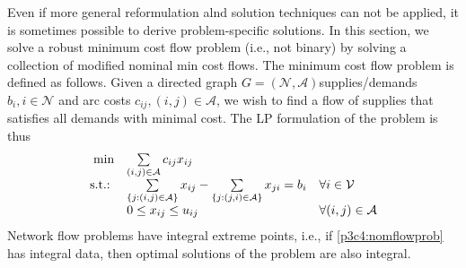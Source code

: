 Even if more general reformulation alnd solution techniques can not be applied, it is sometimes possible to derive problem-specific solutions. In this section, we solve a robust minimum cost flow problem (i.e., not binary) by solving a collection of modified nominal min cost flows. The minimum cost flow problem is defined as follows. Given a directed graph $G=(\mathcal{N}, \mathcal{A})$supplies/demands $b_i,i\in\mathcal{N}$ and arc costs $c_{ij}, (i,j)\in\mathcal{A}$, we wish to find a flow of supplies that satisfies all demands with minimal cost. The LP formulation of the problem is thus
\begin{equation}\label{p3c4:nomflowprob}
\begin{array}{rll}
\min 		& \sum\limits_{(i,j)\in \mathcal{A}}c_{ij}x_{ij} & \\
\mathop{\text{s.t.:~}}	& \sum\limits_{\{j:(i,j)\in \mathcal{A}\}}x_{ij} -\sum\limits_{\{j:(j,i)\in  \mathcal{A}\}}x_{ji} = b_i & \forall i\in \mathcal{V} \\
			& 0\leq x_{ij} \leq u_{ij} &\forall (i,j)\in  \mathcal{A} \\
\end{array}
\end{equation}
Network flow problems have integral extreme points, i.e., if \eqref{p3c4:nomflowprob} has integral data, then optimal solutions of the problem are also integral.

